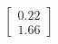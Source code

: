 \documentclass[preview]{standalone}
\begin{document}
\begin{align*}
\begin{bmatrix} 0.22 \\ 1.66 \end{bmatrix}
\end{align*}
\end{document}
